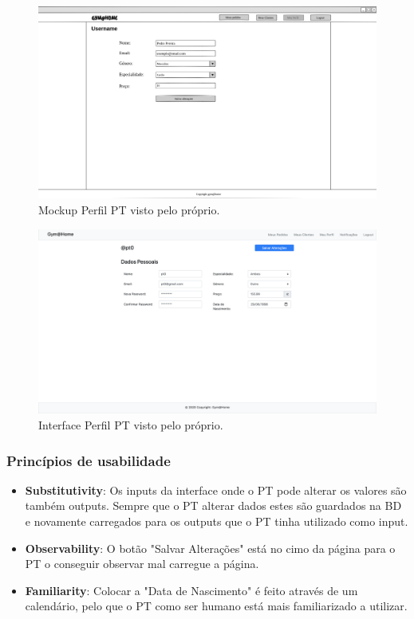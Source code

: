 \begin{figure}[H]
    \centering
    \includegraphics[scale=0.25]{images/mockups/pt_meu_perfil.png}
    \caption{Mockup Perfil PT visto pelo próprio.}
    \label{fig:mockupperfilptbypt}
\end{figure}

\begin{figure}[H]
    \centering
    \includegraphics[scale=0.25]{images/interfaces/pt_perfil.png}
    \caption{Interface Perfil PT visto pelo próprio.}
    \label{fig:interfaceperfilptbypt}
\end{figure}

\subsubsection{Princípios de usabilidade}
\begin{itemize}
   \item \textbf{Substitutivity}: Os inputs da interface onde o PT pode alterar os valores são também outputs. Sempre que o PT alterar dados estes são guardados na BD e novamente carregados para os outputs que o PT tinha utilizado como input.
    
    \item \textbf{Observability}: O botão "Salvar Alterações" está no cimo da página para o PT o conseguir observar mal carregue a página.
    
    \item \textbf{Familiarity}: Colocar a "Data de Nascimento" é feito através de um calendário, pelo que o PT como ser humano está mais familiarizado a utilizar.
\end{itemize}

